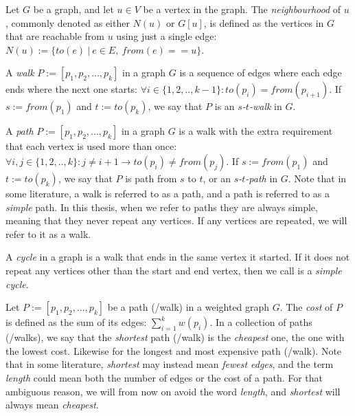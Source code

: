 \begin{definition}[Neighbourhood]
    Let $G$ be a graph, and let $u \in V$ be a vertex in the graph. The \emph{neighbourhood} of $u$, commonly denoted as either $N(u)$ or $G[u]$, is defined as the vertices in $G$ that are reachable from $u$ using just a single edge: $N(u) := \{ to(e)  ~|~  e \in E, ~ from(e) == u\}$.
\end{definition}

\begin{definition}[Walk]
    A \emph{walk} $P := [p_1, p_2, ..., p_k]$ in a graph $G$ is a sequence of edges where each edge ends where the next one starts: $\forall i \in \{1,2,..,k-1\} : to(p_i) = from(p_{i+1})$.
    If $s := from(p_1)$ and $t := to(p_k)$, we say that $P$ is an \emph{$s$-$t$-walk} in $G$.
\end{definition}

\begin{definition}[Path]
    A \emph{path} $P := [p_1, p_2, ..., p_k]$ in a graph $G$ is a walk with the extra requirement that each vertex is used more than once: $\forall i, j \in \{1,2,..,k\} : j \neq {i+1} \rightarrow to(p_i) \neq from(p_j)$.
    If $s := from(p_1)$ and $t := to(p_k)$, we say that $P$ is path from $s$ to $t$, or an \emph{$s$-$t$-path} in $G$.
    Note that in some literature, a walk is referred to as a path, and a path is referred to as a \emph{simple} path. In this thesis, when we refer to paths they are always simple, meaning that they never repeat any vertices. If any vertices are repeated, we will refer to it as a walk.    
\end{definition}

\begin{definition}[Cycle]
    A \emph{cycle} in a graph is a walk that ends in the same vertex it started. If it does not repeat any vertices other than the start and end vertex, then we call is a \emph{simple cycle}.
\end{definition}

\begin{definition}
    Let $P := [p_1, p_2, ..., p_k]$ be a path (/walk) in a weighted graph $G$. The \emph{cost} of $P$ is defined as the sum of its edges: $\sum_{i=1}^k w(p_i)$. In a collection of paths (/walks), we say that the \emph{shortest} path (/walk) is the \emph{cheapest} one, the one with the lowest cost. Likewise for the longest and most expensive path (/walk). Note that in some literature, \emph{shortest} may instead mean \emph{fewest edges}, and the term \emph{length} could mean both the number of edges or the cost of a path. For that ambiguous reason, we will from now on avoid the word \emph{length}, and \emph{shortest} will always mean \emph{cheapest}.
\end{definition}

